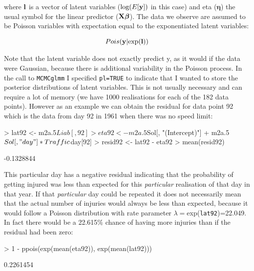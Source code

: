 \documentclass{article}
\begin{document}
where ${\bf l}$ is a vector of latent variables ($\textrm{log}(E[{\bf y}])$ in this case) and eta (${\bm \eta}$) the usual symbol for the linear predictor (${\bf X}{\bm \beta}$). The data we observe are assumed to be Poisson variables with expectation equal to the exponentiated latent variables: 

\begin{equation}
Pois({\bf y} | \textrm{exp}({\bf l}))
\end{equation}


Note that the latent variable does not exactly predict y, as it would if the data were Gaussian, because there is additional variability in the Poisson process. In the call to \texttt{MCMCglmm} I specified \texttt{pl=TRUE} to indicate that I wanted to store the posterior distributions of latent variables. This is not usually necessary and can require a lot of memory (we have 1000 realisations for each of the 182 data points). However as an example we can obtain the residual for data point 92 which is the data from day 92 in 1961 when there was no speed limit:

\begin{Schunk}
\begin{Sinput}
> lat92 <- m2a.5$Liab[, 92]
> eta92 <- m2a.5$Sol[, "(Intercept)"] + m2a.5$Sol[, "day"] * Traffic$day[92]
> resid92 <- lat92 - eta92
> mean(resid92)
\end{Sinput}
\begin{Soutput}
[1] -0.1328844
\end{Soutput}
\end{Schunk}

This particular day has a negative residual indicating that the probability of getting injured was less than expected for this \emph{particular} realisation of that day in that year. If that \emph{particular} day could be repeated it does not necessarily mean that the actual number of injuries would always be less than expected, because it would follow a Poisson distribution with rate parameter $\lambda=$exp(\texttt{lat92})=22.049. In fact there would be a 22.615\% chance of having more injuries than if the residual had been zero:

\begin{Schunk}
\begin{Sinput}
> 1 - ppois(exp(mean(eta92)), exp(mean(lat92)))
\end{Sinput}
\begin{Soutput}
[1] 0.2261454
\end{Soutput}
\end{Schunk}
\end{document}

